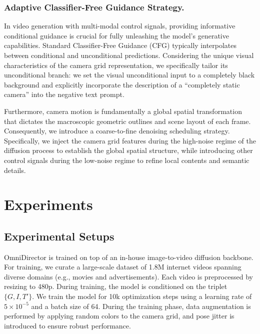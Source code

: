 \documentclass{llmxive}
\begin{document}

\subsubsection{Adaptive Classifier-Free Guidance Strategy.}
In video generation with multi-modal control signals, providing informative conditional guidance is crucial for fully unleashing the model's generative capabilities. Standard Classifier-Free Guidance (CFG) typically interpolates between conditional and unconditional predictions. Considering the unique visual characteristics of the camera grid representation, we specifically tailor its unconditional branch: we set the visual unconditional input to a completely black background and explicitly incorporate the description of a ``completely static camera'' into the negative text prompt. 

Furthermore, camera motion is fundamentally a global spatial transformation that dictates the macroscopic geometric outlines and scene layout of each frame. Consequently, we introduce a coarse-to-fine denoising scheduling strategy. Specifically, we inject the camera grid features during the high-noise regime of the diffusion process to establish the global spatial structure, while introducing other control signals during the low-noise regime to refine local contents and semantic details.


\section{Experiments}
\subsection{Experimental Setups}
OmniDirector is trained on top of an in-house image-to-video diffusion backbone. For training, we curate a large-scale dataset of 1.8M internet videos spanning diverse domains (e.g., movies and advertisements). Each video is preprocessed by resizing to 480p. During training, the model is conditioned on the triplet $\{G, I, T'\}$. We train the model for 10k optimization steps using a learning rate of $5\times 10^{-5}$ and a batch size of 64. During the training phase, data augmentation is performed by applying random colors to the camera grid, and pose jitter is introduced to ensure robust performance.
\end{document}
